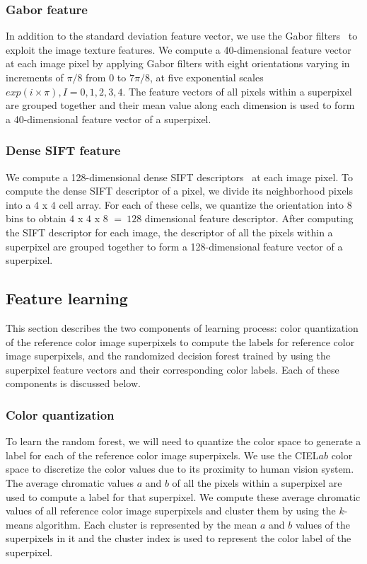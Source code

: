 \documentclass[twocolumn]{svjour3}          %
\begin{document}
\subsubsection{Gabor feature}
 In addition to the standard deviation feature vector, we use the Gabor filters~\cite{BS96} to exploit the image texture features. We compute a 40-dimensional feature vector at each image pixel by applying Gabor filters with eight orientations varying in increments of $\pi/8$ from 0 to $7\pi/8$, at five exponential scales $exp(i \times \pi), I = 0, 1, 2, 3, 4$. The feature vectors of all pixels within a superpixel are grouped together and their mean value along each dimension is used to form a  40-dimensional feature vector of a superpixel.

\subsubsection{Dense SIFT feature}
We compute a 128-dimensional dense SIFT descriptors~\cite{Liu11} at each image pixel. To compute the dense SIFT descriptor of a pixel, we divide its neighborhood pixels into a $4$ x $4$ cell array. For each of these cells, we quantize the orientation into 8 bins to obtain $4$ x $4$ x $8$ $=\ 128$ dimensional feature descriptor. After computing the SIFT descriptor for each image, the descriptor of all the pixels within a superpixel are grouped together to form a 128-dimensional feature vector of a superpixel.

\subsection{Feature learning}
This section describes the two components of learning process: color quantization of the reference color image superpixels to compute the labels for reference color image superpixels, and the randomized decision forest trained by using the superpixel feature vectors and their corresponding color labels. Each of these components is discussed below.

\subsubsection{Color quantization}
\label{sec:quantization}
To learn the random forest, we will need to quantize the color space to generate a label for each of the reference color image superpixels. We use the CIEL$ab$ color space to discretize the color values due to its proximity to human vision system. The average chromatic values $a$ and $b$ of all the pixels within a superpixel are used to compute a label for that superpixel. We compute these average chromatic values of all reference color image superpixels and cluster them by using the $k$-means algorithm. Each cluster is represented by the mean $a$ and $b$ values of the superpixels in it and the cluster index is used to represent the color label of the superpixel.
\end{document}
